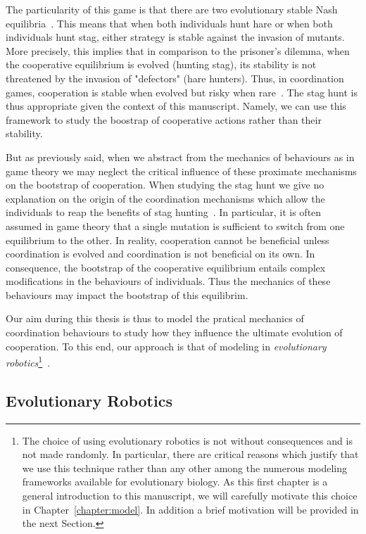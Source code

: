    The particularity of this game is that there are two evolutionary stable Nash equilibria~\parencite{Nash1950, MaynardSmith1973}. This means that when both individuals hunt hare or when both individuals hunt stag, either strategy is stable against the invasion of mutants. More precisely, this implies that in comparison to the prisoner's dilemma, when the cooperative equilibrium is evolved (hunting stag), its stability is not threatened by the invasion of "defectors" (hare hunters). Thus, in coordination games, cooperation is stable when evolved but risky when rare~\parencite{Forber2015}. The stag hunt is thus appropriate given the context of this manuscript. Namely, we can use this framework to study the boostrap of cooperative actions rather than their stability.

    But as previously said, when we abstract from the mechanics of behaviours as in game theory we may neglect the critical influence of these proximate mechanisms on the bootstrap of cooperation. When studying the stag hunt we give no explanation on the origin of the coordination mechanisms which allow the individuals to reap the benefits of stag hunting~\parencite{Calcott2007a}. In particular, it is often assumed in game theory that a single mutation is sufficient to switch from one equilibrium to the other. In reality, cooperation cannot be beneficial unless coordination is evolved and coordination is not beneficial on its own. In consequence, the bootstrap of the cooperative equilibrium entails complex modifications in the behaviours of individuals. Thus the mechanics of these behaviours may impact the bootstrap of this equilibrim.

    Our aim during this thesis is thus to model the pratical mechanics of coordination behaviours to study how they influence the ultimate evolution of cooperation. To this end, our approach is that of modeling in \emph{evolutionary robotics}\footnote{The choice of using evolutionary robotics is not without consequences and is not made randomly. In particular, there are critical reasons which justify that we use this technique rather than any other among the numerous modeling frameworks available for evolutionary biology. As this first chapter is a general introduction to this manuscript, we will carefully motivate this choice in Chapter~\ref{chapter:model}. In addition a brief motivation will be provided in the next Section.}~\parencite{Nolfi2000}.


  \subsection{Evolutionary Robotics}

